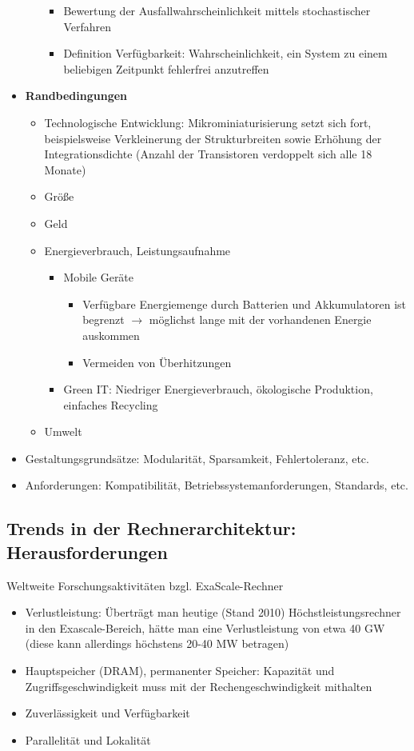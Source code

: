 \begin{itemize}
\begin{itemize}
\begin{itemize}
			\item Bewertung der Ausfallwahrscheinlichkeit mittels stochastischer Verfahren
			\item Definition Verfügbarkeit: Wahrscheinlichkeit, ein System zu einem beliebigen Zeitpunkt fehlerfrei anzutreffen
		\end{itemize}
	\end{itemize}
	\item \textbf{Randbedingungen}
	\begin{itemize}
		\item Technologische Entwicklung: Mikrominiaturisierung setzt sich fort, beispielsweise Verkleinerung der Strukturbreiten sowie Erhöhung der Integrationsdichte (Anzahl der Transistoren verdoppelt sich alle 18 Monate)
		\item Größe
		\item Geld
		\item Energieverbrauch, Leistungsaufnahme
		\begin{itemize}
			\item Mobile Geräte
			\begin{itemize}
				\item Verfügbare Energiemenge durch Batterien und Akkumulatoren ist begrenzt \(\rightarrow\) möglichst lange mit der vorhandenen Energie auskommen
				\item Vermeiden von Überhitzungen
			\end{itemize}
			\item Green IT: Niedriger Energieverbrauch, ökologische Produktion, einfaches Recycling
		\end{itemize}
		\item Umwelt
	\end{itemize}
	\item Gestaltungsgrundsätze: Modularität, Sparsamkeit, Fehlertoleranz, etc.
	\item Anforderungen: Kompatibilität, Betriebssystemanforderungen, Standards, etc.
\end{itemize}

\subsection{Trends in der Rechnerarchitektur: Herausforderungen}
Weltweite Forschungsaktivitäten bzgl. ExaScale-Rechner
\begin{itemize}
	\item Verlustleistung: Überträgt man heutige (Stand 2010) Höchstleistungsrechner in den Exascale-Bereich, hätte man eine Verlustleistung von etwa 40 GW (diese kann allerdings höchstens 20-40 MW betragen)
	\item Hauptspeicher (DRAM), permanenter Speicher: Kapazität und Zugriffsgeschwindigkeit muss mit der Rechengeschwindigkeit mithalten
	\item Zuverlässigkeit und Verfügbarkeit
	\item Parallelität und Lokalität
\end{itemize}


